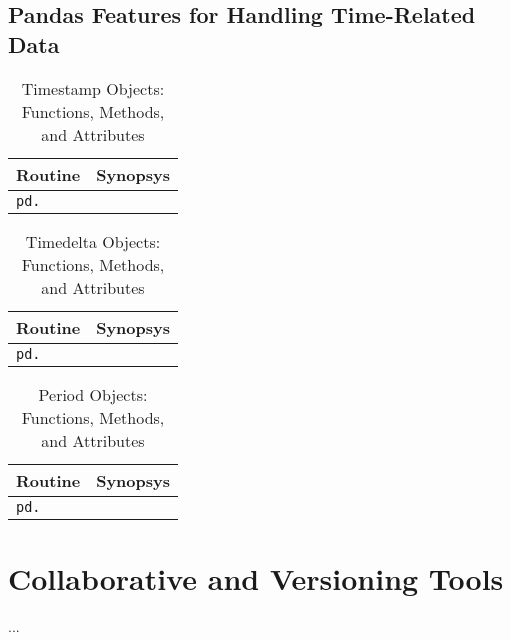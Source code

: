 \documentclass[a4paper,11pt]{book}
\numberwithin{figure}{chapter}
\numberwithin{table}{chapter}
\begin{document}
\begin{appendices}
\section{Pandas Features for Handling Time-Related Data}
\label{sec:pandas_time}

\begin{table}
	\caption{Timestamp Objects: Functions, Methods, and Attributes}
	\label{tab:pandas_timestamp}
	\begin{tabular}{p{7.5cm}p{8.5cm}}
		\toprule\toprule
		Routine & Synopsys \\
		\midrule
		\texttt{pd.} & 
                \\
		\bottomrule
      	\end{tabular}
\end{table}

\begin{table}
	\caption{Timedelta Objects: Functions, Methods, and Attributes}
	\label{tab:pandas_timedelta}
	\begin{tabular}{p{7.5cm}p{8.5cm}}
		\toprule\toprule
		Routine & Synopsys \\
		\midrule
		\texttt{pd.} & 
                \\
		\bottomrule
      	\end{tabular}
\end{table}

\begin{table}
	\caption{Period Objects: Functions, Methods, and Attributes}
	\label{tab:pandas_period}
	\begin{tabular}{p{7.5cm}p{8.5cm}}
		\toprule\toprule
		Routine & Synopsys \\
		\midrule
		\texttt{pd.} & 
                \\
		\bottomrule
      	\end{tabular}
\end{table}

\chapter{Collaborative and Versioning Tools}

...

\end{appendices}
\end{document}
